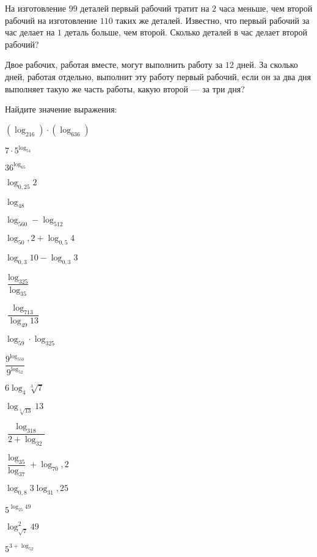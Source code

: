 \begin{class}[number=6]
\begin{listofex}
		\item На изготовление \( 99 \) деталей первый рабочий тратит на \( 2 \) часа меньше, чем второй рабочий на изготовление \( 110 \) таких же деталей. Известно, что первый рабочий за час делает на \( 1 \) деталь больше, чем второй. Сколько деталей в час делает второй рабочий?
		\item Двое рабочих, работая вместе, могут выполнить работу за \( 12 \) дней. За сколько дней, работая отдельно, выполнит эту работу первый рабочий, если он за два дня выполняет такую же часть работы, какую второй --- за три дня?
	\end{listofex}
\end{class}
%
%
\begin{class}[number=6]
	\begin{listofex}
		\item {}
		\item Найдите значение выражения:
		\begin{enumcols}[itemcolumns=3]
			\item \( (\log_216)\cdot(\log_636) \)
			\item \( 7\cdot5^{\log_54} \)
			\item \( 36^{\log_65} \)
			\item \( \log_{0,25}2 \)
			\item \( \log_48 \)
			\item \( \log_560-\log_512 \)
			\item \( \log_50,2+\log_{0,5}4 \)
			\item \( \log_{0,3}10-\log_{0,3}3 \)
			\item \( \dfrac{\log_325}{\log_35} \)
			\item \( \dfrac{\log_713}{\log_{49}13} \)
			\item \( \log_59\cdot\log_325 \)
			\item \( \dfrac{9^{\log_550}}{9^{\log_52}} \)
			\item \( 6\log_4\sqrt[3]{7} \)
			\item \( \log_{\sqrt[6]{13}}13 \)
			\item \( \dfrac{\log_318}{2+\log_32} \)
			\item \( \dfrac{\log_35}{\log_37}+\log_70,2 \)
			\item \( \log_{0,8}3\log_31,25 \)
			\item \( 5^{\log_{25}49} \)
			\item \( \log^2_{\sqrt{7}}49 \)
			\item \( 5^{3+\log_52} \)

\end{enumcols}
\end{listofex}
\end{class}
